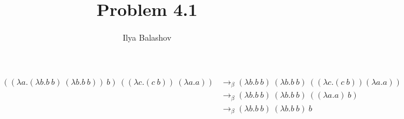 \documentclass[12pt]{article}
\title{Problem 4.1}
\author{Ilya Balashov}
\date{}
\begin{document}
\maketitle

\begin{align*}
((\lambda a.(\lambda b.b\ b)\ (\lambda b.b\ b))\ b)\ ((\lambda c. (c\ b))\ (\lambda a.a)) 
& \longrightarrow_\beta (\lambda b.b\ b)\ (\lambda b.b\ b)\ ((\lambda c.(c\ b)) (\lambda a.a))  \\
& \longrightarrow_\beta (\lambda b.b\ b)\ (\lambda b.b\ b)\ ((\lambda a.a)\ b) \\
& \longrightarrow_\beta (\lambda b.b\ b)\ (\lambda b.b\ b)\ b
\end{align*}
\end{document}
